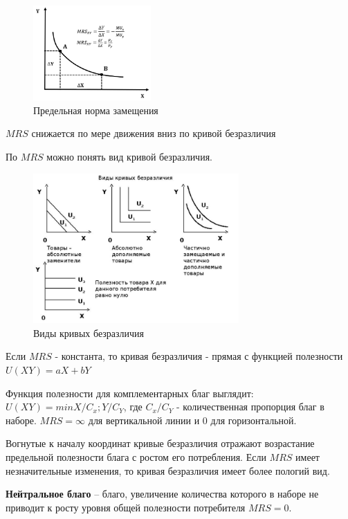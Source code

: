 \documentclass[reqno]{article}
\theoremstyle{definition}
\theoremstyle{definition}
\theoremstyle{definition}
\theoremstyle{definition}
\theoremstyle{definition}
\theoremstyle{definition}
\theoremstyle{definition}
\theoremstyle{definition}
\theoremstyle{definition}
\begin{document}
		\begin{figure}[h!]
			\centering
			\includegraphics[width=0.4\textwidth]{Предельная_норма_замещения}
			\caption{Предельная норма замещения}
		\end{figure}
		
		$MRS$ снижается по мере движения вниз по кривой безразличия
		
		По $MRS$ можно понять вид кривой безразличия.
			
		\begin{figure}[h!]
			\centering
			\includegraphics[width=0.7\textwidth]{Виды_кривых_безразличия}
			\caption{Виды кривых безразличия}
		\end{figure}
	
		Если $MRS$ - константа, то кривая безразличия - прямая с функцией полезности $U(XY)=aX + bY$
		
		Функция полезности для комплементарных благ выглядит: $U(XY) = min{X/C_x; Y/C_Y}$, где $C_x/C_Y$ - количественная пропорция благ в наборе. $MRS = \infty$ для вертикальной линии и $0$ для горизонтальной.
		
		Вогнутые к началу координат кривые безразличия отражают возрастание предельной полезности блага с ростом его потребления. 
		Если $MRS$ имеет незначительные изменения, то кривая безразличия имеет более пологий вид.
		
		
		\textbf{Нейтральное благо} -- благо, увеличение количества которого в наборе не приводит к росту уровня общей полезности потребителя $MRS =0$.\\
		
\end{document}
